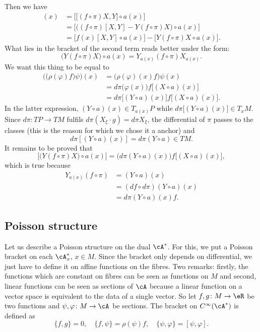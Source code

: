 Then we have
\begin{align*}
	[f\psi,\varphi](x) & =\Big[ \big[ (f\circ\pi)X,Y \big]\circ a(x) \Big]                     \\
	                   & =\Big[ \big( (f\circ\pi)[X,Y]-Y(f\circ\pi)X \big)\circ a(x) \Big]     \\
	                   & =\big[ f(x)[X,Y]\circ a(x) \big]-\big[ Y(f\circ\pi)X\circ a(x) \big].
\end{align*}
What lies in the bracket of the second term reads better under the form:
\[
	\big( Y(f\circ\pi)X \big)\circ a(x)=Y_{a(x)}(f\circ\pi)X_{a(x)}.
\]
We want this thing to be equal to
\begin{align*}
	\Big( \big( \rho(\varphi)f \big)\psi \Big)(x) & =\big( \rho(\varphi)(x)f \big)\psi(x)                     \\
	                                              & =d\pi\big( \varphi(x) \big)f\big[ (X\circ a)(x) \big]     \\
	                                              & =d\pi\big[ (Y\circ a)(x) \big]f\big[ (X\circ a)(x) \big].
\end{align*}
In the latter expression, $(Y\circ a)(x)\in T_{a(x)}P$ while  $d\pi\big[ (Y\circ a)(x)\Big]\in T_{x}M$. Since $d\pi\colon TP\to TM$ fulfils $d\pi(X_{\xi}\cdot g)=d\pi X_{\xi}$, the differential of $\pi$ passes to the classes (this is the reason for which we chose it a anchor) and
\[
	d\pi[(Y\circ a)(x)]=d\pi(Y\circ a)\in TM.
\]
It remains to be proved that
\[
	\Big[ \big( Y(f\circ\pi)X \big)\circ a(x) \Big]=\big( d\pi(Y\circ a)(x) \big)f\big[ (X\circ a)(x) \big],
\]
which is true because
\begin{align*}
	Y_{a(x)}(f\circ\pi) & =(Y\circ a)(x)               \\
	                    & =(df\circ d\pi)(Y\circ a)(x) \\
	                    & =d\pi(Y\circ a)(x)f.
\end{align*}

\subsection{Poisson structure}

Let us describe a Poisson structure on the dual $\cA^*$. For this, we put a Poisson bracket on each $\cA^*_{x}$, $x\in M$. Since the bracket only depends on differential, we just have to define it on affine functions on the fibres. Two remarks: firstly, the functions which are constant on fibres can be seen as functions on $M$ and second, linear functions can be seen as sections of $\cA$ because a linear function on a vector space is equivalent to the data of a single vector. So let $f,g\colon M\to \eR$ be two functions and $\psi,\varphi\colon M\to \cA$ be sections. The bracket on $ C^{\infty}(\cA^*)$ is defined as
\begin{equation}
	\{ f,g \}=0,\quad \{ f,\psi \}=\rho(\psi)f,\quad\{ \psi,\varphi \}=[\psi,\varphi].
\end{equation}


